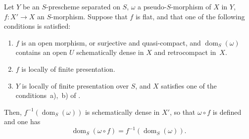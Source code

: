 \begin{proposition}[20.3.11]
\label{IV.20.3.11}
Let $Y$ be an $S$-prescheme separated on $S$, $\omega$ a pseudo-$S$-morphism of $X$ in $Y$, $f:X'\to X$ an $S$-morphism.
Suppose that $f$ is flat, and that one of the following conditions is satisfied:
\begin{enumerate}[label=\emph{(\roman*)}]
  \item $f$ is an open morphism, or surjective and quasi-compact, and $\operatorname{dom}_S(\omega)$ contains an open $U$ schematically dense in $X$ and retrocompact in~$X$.
  \item $f$ is locally of finite presentation.
  \item $Y$ is locally of finite presentation over $S$, and $X$ satisfies one of the conditions~a),~b) of .
\end{enumerate}
Then, $f^{-1}(\operatorname{dom}_S(\omega))$ is schematically dense in $X'$, so that $\omega\circ f$ is defined  and one has
\[
\label{IV.20.3.11.1}
  \operatorname{dom}_S(\omega\circ f)=f^{-1}(\operatorname{dom}_S(\omega)).
  \tag{20.3.11.1}
\]
\end{proposition}

